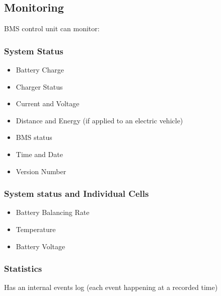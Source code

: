 \subsection{Monitoring}

BMS control unit can monitor:

\subsubsection{System Status}
\begin{itemize}
	\item Battery Charge
	\item Charger Status
	\item Current and Voltage
	\item Distance and Energy (if applied to an electric vehicle)
	\item BMS status
	\item Time and Date
	\item Version Number
\end{itemize}

\subsubsection{System status and Individual Cells}
\begin{itemize}
	\item Battery Balancing Rate
	\item Temperature
	\item Battery Voltage
\end{itemize}

\subsubsection{Statistics}
Has an internal events log (each event happening at a recorded time)

